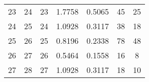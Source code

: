 \begin{table}
\begin{adjustbox}{width=1.2\textwidth,center=\textwidth}
\begin{tabular}{ccccccc}
23                                                        & 24                                                          & 23                                                  & 1.7758                                                                     & 0.5065                                                                    & 45                                                                          & 25                                                                               \\
24                                                        & 25                                                          & 24                                                  & 1.0928                                                                     & 0.3117                                                                    & 38                                                                          & 18                                                                               \\
25                                                        & 26                                                          & 25                                                  & 0.8196                                                                     & 0.2338                                                                    & 78                                                                          & 48                                                                               \\
26                                                        & 27                                                          & 26                                                  & 0.5464                                                                     & 0.1558                                                                    & 16                                                                          & 8                                                                                \\
27                                                        & 28                                                          & 27                                                  & 1.0928                                                                     & 0.3117                                                                    & 18                                                                          & 10                                                                               \\

\end{tabular}
\end{adjustbox}
\end{table}

